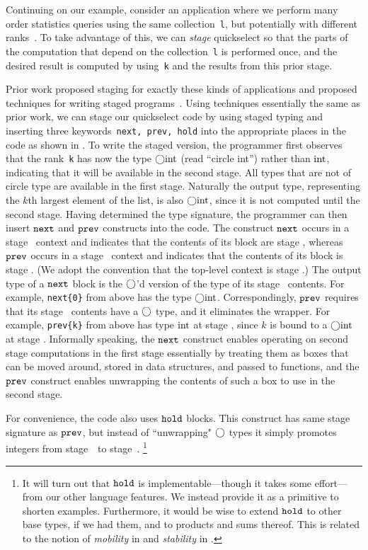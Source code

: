 Continuing on our example, consider an application where we perform
many order statistics queries using the same collection~\texttt{l}, but
potentially with different ranks~\cite{k}.  To take advantage of this,
we can {\em stage} quickselect so that the parts of the computation
that depend on the collection~\texttt{l} is performed once, and the
desired result is computed by using~\texttt{k} and the results from
this prior stage. 

Prior work proposed staging for exactly these kinds of applications
and proposed techniques for writing staged
programs~\cite{staging}. Using techniques essentially the same as
prior work, we can stage our quickselect code by using staged typing
and inserting three keywords~\texttt{next, prev, hold} into the
appropriate places in the code as shown in . To
write the staged version, the programmer first observes that the
rank~\texttt{k} has now the type $\bigcirc{\rm int}$ (read ``circle int'')
rather than ${\rm int}$, indicating that it will be available in the
second stage.  All types that are not of circle type are available in
the first stage.  Naturally the output type, representing the $k$th
largest element of the list, is also $\bigcirc{\rm int}$, since it is not
computed until the second stage. Having determined the type signature,
the programmer can then insert ${\tt next}$ and ${\tt prev}$ constructs into the
code. The construct ${\tt next}$ occurs in a stage \bbone\ context and
indicates that the contents of its block are stage \bbtwo, whereas
${\tt prev}$ occurs in a stage \bbtwo\ context and indicates that the
contents of its block is stage \bbone.  (We adopt the convention that
the top-level context is stage \bbone.)  The output type of a ${\tt next}$
block is the $\bigcirc$'d version of the type of its stage
\bbtwo\ contents.  For example, \verb|next{0}| from above has the type
$\bigcirc{\rm int}$.  Correspondingly, ${\tt prev}$ requires that its stage
\bbone\ contents have a $\bigcirc$ type, and it eliminates the wrapper.
For example, \verb|prev{k}| from above has type ${\rm int}$ at stage
\bbtwo, since $k$ is bound to a $\bigcirc{\rm int}$ at stage
\bbone. Informally speaking, the
${\tt next}$ construct enables operating on second stage computations in
the first stage essentially by treating them as boxes that can be
moved around, stored in data structures, and passed to functions, and
the ${\tt prev}$ construct enables unwrapping the contents of such a box to
use in the second stage. 




For convenience, the code also uses ${\tt hold}$ blocks.  This construct
has same stage signature as ${\tt prev}$, but instead of ``unwrapping"
$\bigcirc$ types it simply promotes integers from stage~\bbone\ to
stage~\bbtwo.
\footnote{It will turn out that ${\tt hold}$ is implementable---though it takes some effort---from our other language features.
We instead provide it as a primitive to shorten examples.  
Furthermore, it would be wise to extend ${\tt hold}$ to other base types, if we had them, and to products and sums thereof.
This is related to the notion of {\em mobility} in \cite{murphy05} and
{\em stability} in \cite{krishnaswami13}.} 

